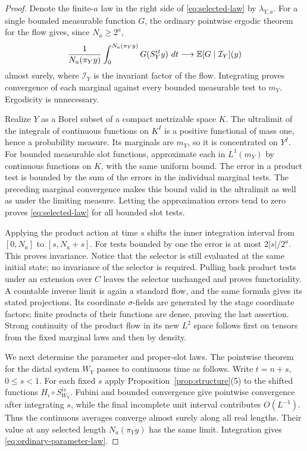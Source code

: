 \begin{proof}
Denote the finite-$a$ law in the right side of
\eqref{eq:selected-law} by $\lambda_{Y,a}$.  For a single bounded
measurable function $G$, the ordinary pointwise ergodic theorem for
the flow gives, since $N_a\ge2^a$,
\[
 \frac1{N_a(\pi_Yy)}\int_0^{N_a(\pi_Yy)}G(S_Y^{it}y)\,\,d t
 \longrightarrow \mathbb E[G\mid\mathcal I_Y](y)
\]
almost surely, where $\mathcal I_Y$ is the invariant factor of the
flow.  Integrating proves convergence of each marginal against
every bounded measurable test to $m_Y$.  Ergodicity is unnecessary.

Realize $Y$ as a Borel subset of a compact metrizable space $K$.
The ultralimit of the integrals of continuous functions on $K^I$
is a positive functional of mass one, hence a probability measure.
Its marginals are $m_Y$, so it is concentrated on $Y^I$.
For bounded measurable slot functions, approximate each in
$L^1(m_Y)$ by continuous functions on $K$, with the same uniform
bound.  The error in a product test is bounded by the sum of the
errors in the individual marginal tests.  The preceding marginal
convergence makes this bound valid in the ultralimit as well as
under the limiting measure.  Letting the approximation errors tend
to zero proves \eqref{eq:selected-law} for all bounded slot tests.

Applying the product action at time $s$ shifts the inner integration
interval from $[0,N_a]$ to $[s,N_a+s]$.  For tests bounded by one the
error is at most $2|s|/2^a$.  This proves invariance.  Notice that
the selector is still evaluated at the same initial state; no
invariance of the selector is required.  Pulling back product tests
under an extension over $C$ leaves the selector unchanged and proves
functoriality.  A countable inverse limit is again a standard flow,
and the same formula gives its stated projections.  Its coordinate
$\sigma$-fields are generated by the stage coordinate factors;
finite products of their functions are dense, proving the last
assertion.  Strong continuity of the product flow in its new $L^2$
space follows first on tensors from the fixed marginal laws and
then by density.

We next determine the parameter and proper-slot laws.  The pointwise
theorem for the distal system $W_Y$ passes to continuous time as
follows.  Write $t=n+s$, $0\le s<1$.  For each fixed $s$ apply
Proposition~\ref{prop:structure}(5) to the shifted functions
$H_i\circ S_{W_Y}^{is}$.  Fubini and bounded convergence give
pointwise convergence after integrating $s$, while the final
incomplete unit interval contributes $O(L^{-1})$.  Thus the
continuous averages converge almost surely along all real lengths.
Their value at any selected length $N_a(\pi_Yy)$ has the same
limit.  Integration gives \eqref{eq:ordinary-parameter-law}.


\end{proof}
